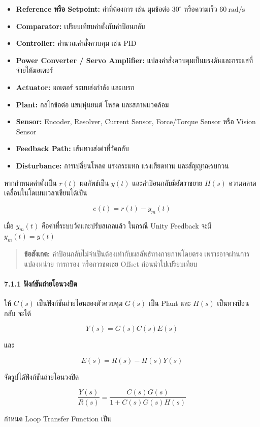 \begin{itemize}
    \item \textbf{Reference หรือ Setpoint:} ค่าที่ต้องการ เช่น มุมข้อต่อ $30^\circ$ หรือความเร็ว $60\ \text{rad/s}$
    \item \textbf{Comparator:} เปรียบเทียบค่าตั้งกับค่าป้อนกลับ
    \item \textbf{Controller:} คำนวณคำสั่งควบคุม เช่น PID
    \item \textbf{Power Converter / Servo Amplifier:} แปลงคำสั่งควบคุมเป็นแรงดันและกระแสที่จ่ายให้มอเตอร์
    \item \textbf{Actuator:} มอเตอร์ ระบบส่งกำลัง และเบรก
    \item \textbf{Plant:} กลไกข้อต่อ แขนหุ่นยนต์ โหลด และสภาพแวดล้อม
    \item \textbf{Sensor:} Encoder, Resolver, Current Sensor, Force/Torque Sensor หรือ Vision Sensor
    \item \textbf{Feedback Path:} เส้นทางส่งค่าที่วัดกลับ
    \item \textbf{Disturbance:} การเปลี่ยนโหลด แรงกระแทก แรงเสียดทาน และสัญญาณรบกวน
\end{itemize}

หากกำหนดค่าตั้งเป็น $r(t)$ ผลลัพธ์เป็น $y(t)$ และค่าป้อนกลับมีอัตราขยาย $H(s)$ ความคลาดเคลื่อนในโดเมนเวลาเขียนได้เป็น

\[
e(t)=r(t)-y_m(t)
\]

เมื่อ $y_m(t)$ คือค่าที่ระบบวัดและปรับสเกลแล้ว ในกรณี Unity Feedback จะมี $y_m(t)=y(t)$

\begin{quote}
\textbf{ข้อสังเกต:} ค่าป้อนกลับไม่จำเป็นต้องเท่ากับผลลัพธ์ทางกายภาพโดยตรง เพราะอาจผ่านการแปลงหน่วย การกรอง หรือการชดเชย Offset ก่อนนำไปเปรียบเทียบ
\end{quote}

\paragraph{7.1.1 ฟังก์ชันถ่ายโอนวงปิด}

ให้ $C(s)$ เป็นฟังก์ชันถ่ายโอนของตัวควบคุม $G(s)$ เป็น Plant และ $H(s)$ เป็นทางป้อนกลับ จะได้

\[
Y(s)=G(s)C(s)E(s)
\]

และ

\[
E(s)=R(s)-H(s)Y(s)
\]

จัดรูปได้ฟังก์ชันถ่ายโอนวงปิด

\[
\frac{Y(s)}{R(s)}=\frac{C(s)G(s)}{1+C(s)G(s)H(s)}
\]

กำหนด Loop Transfer Function เป็น

